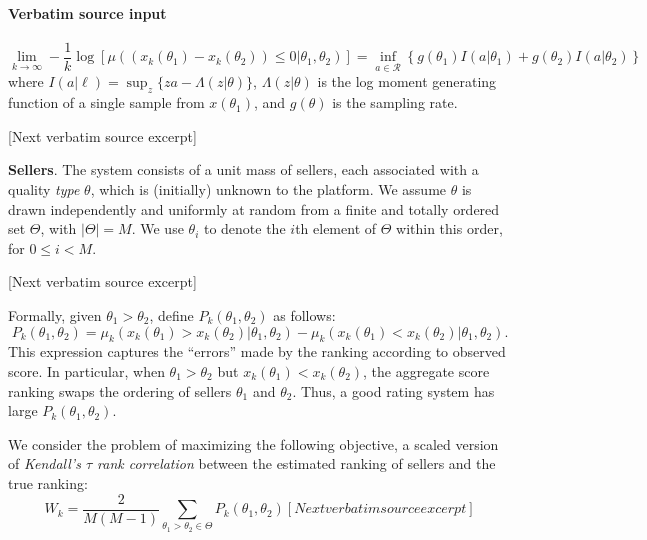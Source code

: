 \documentclass[10pt]{article}
\begin{document}
\paragraph{Verbatim source input}
\begin{ReviewVerbatim}
\begin{lemma}
	$$	\lim_{k \to \infty}- \frac{1}{k} \log \left[\mu((x_k(\theta_1) - x_k(\theta_2)) \leq 0 | \theta_1 , \theta_2)\right] = \inf_{a \in \mathcal{R}} \left \{ g(\theta_1) I(a|\theta_1) + g(\theta_2) I(a|\theta_2) \right \}$$ where $I(a|\ell) = \sup_z \{ za - \Lambda(z|\theta) \}$, $\Lambda(z|\theta)$ is the log moment generating function of a single sample from $x(\theta_1)$, and $g(\theta)$ is the sampling rate. \label{lem:problessthan}
\end{lemma}

[Next verbatim source excerpt]

{\bf Sellers}.  The system consists of a unit mass of sellers, each associated with a quality \textit{type} $\theta$, which is (initially) unknown to the platform. We assume $\theta$ is drawn independently and uniformly at random from a finite and totally ordered set $\Theta$, with $|\Theta| = M$. We use $\theta_i$ to denote the $i$th element of $\Theta$ within this order, for $0\leq i < M$.

[Next verbatim source excerpt]

Formally, given $\theta_1 > \theta_2$, define $P_k(\theta_1, \theta_2)$ as follows:
\begin{equation}
\label{eq:Pk}
P_k(\theta_1, \theta_2) = \mu_k(x_k(\theta_1) > x_k(\theta_2)|\theta_1, \theta_2) - \mu_k(x_k(\theta_1) < x_k(\theta_2)|\theta_1, \theta_2).
\end{equation}
This expression captures the ``errors'' made by the ranking according to observed score.  In particular, when $\theta_1 > \theta_2$ but $x_k(\theta_1) < x_k(\theta_2)$, the aggregate score ranking swaps the ordering of sellers $\theta_1$ and $\theta_2$.  Thus, a good rating system has large $P_k(\theta_1, \theta_2)$.

We consider the problem of maximizing the following objective, a scaled version of {\em Kendall's $\tau$ rank correlation} between the estimated ranking of sellers and the true ranking:
\begin{equation}
\label{eq:objective}
W_k = \frac{2}{M(M-1)}\sum_{\theta_1 > \theta_2 \in \Theta} P_k(\theta_1, \theta_2)

[Next verbatim source excerpt]


\end{equation}
\end{ReviewVerbatim}
\end{document}
